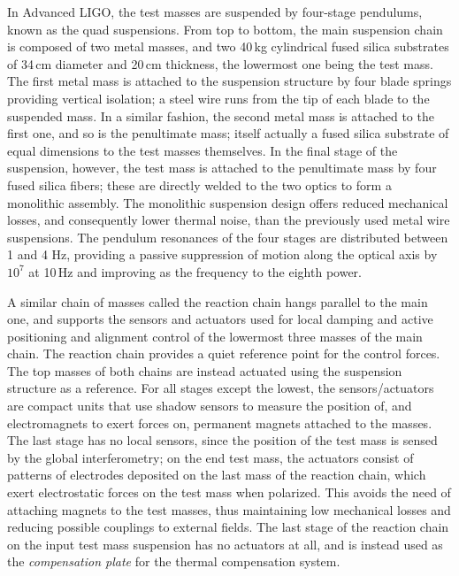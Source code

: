 In Advanced LIGO, the test masses are suspended by four-stage pendulums, known as the quad suspensions\cite{Aston_2012}. 
From top to bottom, the main suspension chain is composed of two metal masses, and two 40\,kg cylindrical fused silica substrates
of 34\,cm diameter and 20\,cm thickness, the lowermost one being the test mass.
The first metal mass is attached to the suspension structure by four blade springs providing vertical isolation;
a steel wire runs from the tip of each blade to the 
suspended mass.
In a similar fashion, the second metal mass is attached to the first one, 
and so is the penultimate mass; itself actually a fused silica substrate of equal dimensions to the test masses themselves. 
In the final stage of the suspension, however, the test mass 
is attached to the penultimate mass by four fused silica fibers; these are directly welded to 
the two optics to form a monolithic assembly.
The monolithic suspension design offers reduced mechanical losses, and
consequently lower thermal noise, than the previously used metal wire suspensions.
The pendulum resonances of the four stages are 
distributed between 1 and 4 Hz, providing a passive suppression of motion along 
the optical axis by $10^7$ at 10\,Hz and improving as the frequency to the eighth power.

A similar chain of masses called the reaction chain hangs parallel to the main one, 
and supports the sensors and actuators used for local damping and active positioning and alignment control 
of the lowermost three masses of the main chain. The reaction chain provides a quiet reference point 
for the control forces.
The top masses of both chains are instead actuated using the suspension structure as a reference.
For all stages except the lowest, the sensors/actuators are compact units that use shadow sensors to measure the position of, and electromagnets to exert forces on, permanent magnets attached to the masses.
The last stage has no local sensors, since the position of the test mass is sensed 
by the global interferometry; on the end test mass, the actuators consist of patterns of electrodes 
deposited on the last mass of the reaction chain, which exert electrostatic forces on the test mass when polarized.
This avoids the need of attaching magnets to the test masses, thus maintaining low mechanical 
losses and reducing possible couplings to external fields.
The last stage of the reaction chain on the input test mass suspension has no actuators at all, and is instead used as the \textit{compensation plate} for the thermal compensation system.


